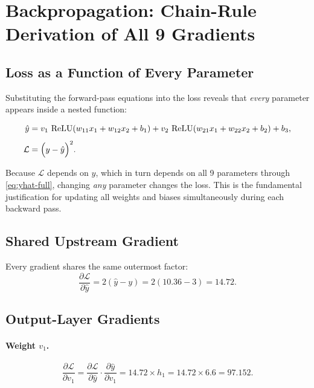 \documentclass[12pt,a4paper]{article}
\newcommand{\Loss}{\mathcal{L}}
\newcommand{\yhat}{\hat{y}}
\newcommand{\ReLU}{\operatorname{ReLU}}
\newcommand{\pderiv}[2]{\dfrac{\partial #1}{\partial #2}}
\begin{document}
\section{Backpropagation: Chain-Rule Derivation of All 9 Gradients}
\label{sec:backprop}

\subsection{Loss as a Function of Every Parameter}
\label{sec:loss-fn}

Substituting the forward-pass equations into the loss reveals that
\emph{every} parameter appears inside a nested function:

\begin{align}
  \yhat &= v_1\,\ReLU(w_{11}x_1 + w_{12}x_2 + b_1)
         + v_2\,\ReLU(w_{21}x_1 + w_{22}x_2 + b_2)
         + b_3, \label{eq:yhat-full}\\[4pt]
  \Loss &= \Bigl(y - \yhat\Bigr)^2. \label{eq:loss-full}
\end{align}

\begin{keyinsight}[title=Why update every parameter?]
Because $\Loss$ depends on $\yhat$, which in turn depends on all 9 parameters
through \cref{eq:yhat-full}, changing \emph{any} parameter changes the loss.
This is the fundamental justification for updating all weights and biases
simultaneously during each backward pass.
\end{keyinsight}

\subsection{Shared Upstream Gradient}

Every gradient shares the same outermost factor:
\begin{equation}
  \pderiv{\Loss}{\yhat} = 2(\yhat - y) = 2(10.36 - 3) = 14.72.
  \label{eq:dL-dyhat}
\end{equation}

\subsection{Output-Layer Gradients}

\paragraph{Weight $v_1$.}
\begin{equation}
  \pderiv{\Loss}{v_1}
    = \pderiv{\Loss}{\yhat}\cdot\pderiv{\yhat}{v_1}
    = 14.72 \times h_1
    = 14.72 \times 6.6 = \mathbf{97.152}.
  \label{eq:grad-v1}
\end{equation}
\end{document}

